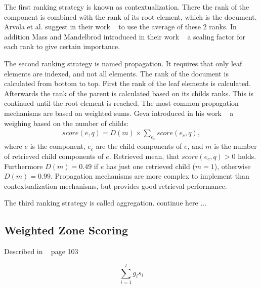 The first ranking strategy is known as contextualization. There the rank of the component is combined with the rank of its root element, which is the document. Arvola et al. suggest in their work ~\cite{ArvolaJK05} to use the average of these $2$ ranks. In addition Mass and Mandelbrod introduced in their work ~\cite{MassM04} a scaling factor for each rank to give certain importance.

The second ranking strategy is named propagation. It requires that only leaf elements are indexed, and not all elements. The rank of the document is calculated from bottom to top. First the rank of the leaf elements is calculated. Afterwards the rank of the parent is calculated based on its childs ranks. This is continued until the root element is reached. The most common propagation mechanisms are based on weighted sums. Geva introduced in his work ~\cite{GS2005} a weighing based on the number of childs:
\begin{align}
  \mathit{score}(e, q) = D(m) \times \sum_{e_c} \mathit{score}(e_c, q),
\end{align}
where $e$ is the component, $e_c$ are the child components of $e$, and $m$ is the number of retrieved child components of $e$. Retrieved mean, that $\mathit{score}(e_c, q) > 0$ holds. Furthermore $D(m) = 0.49$ if $e$ has just one retrieved child ($m = 1$), otherwise $D(m) = 0.99$. Propagation mechanisms are more complex to implement than contextualization mechanisms, but provides good retrieval performance.

The third ranking strategy is called aggregation. continue here ...


\subsection{Weighted Zone Scoring}
\label{sec:weighted_zone_scoring}

Described in ~\cite{manning2008} page 103

\begin{equation}
  \sum_{i = 1}^{l}g_i s_i
\end{equation}



